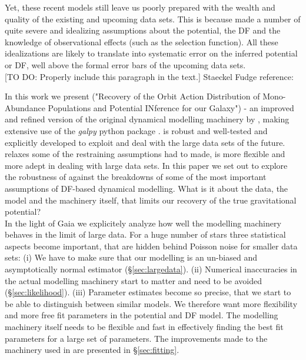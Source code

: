 Yet, these recent models still leave us poorly prepared with the wealth and quality of the existing and upcoming data sets. This is because \citet{bov13} made a number of quite severe and idealizing assumptions about the potential, the DF and the knowledge of observational effects (such as the selection function). All these idealizations are likely to translate into systematic error on the inferred potential or DF, well above the formal error bars of the upcoming data sets. \\

[TO DO: Properly include this paragraph in the text.] Staeckel Fudge reference: \citet{2012MNRAS.426.1324B} 

In this work we present \RM ("\textsc{R}ecovery of the \textsc{O}rbit \textsc{A}ction \textsc{D}istribution of \textsc{M}ono-\textsc{A}bundance \textsc{P}opulations and \textsc{P}otential \textsc{IN}ference for our \textsc{G}alaxy") - an improved and refined version of the original dynamical modelling machinery by \citet{bov13}, making extensive use of the \emph{galpy} python package \citep{bov15}. \RM is robust and well-tested and explicitly developed to exploit and deal with the large data sets of the future. \RM relaxes some of the restraining assumptions \citet{bov13} had to made, is more flexible and more adept in dealing with large data sets. In this paper we set out to explore the robustness of \RM against the breakdowns of some of the most important assumptions of DF-based dynamical modelling. What is it about the data, the model and the machinery itself, that limits our recovery of the true gravitational potential? \\

In the light of Gaia we explicitely analyze how well the modelling machinery behaves in the limit of large data. For a huge number of stars three statistical aspects become important, that are  hidden behind Poisson noise for smaller data sets: (i) We have to make sure that our modelling is an un-biased and asymptotically normal estimator (\S\ref{sec:largedata}). (ii) Numerical inaccuracies in the actual modelling machinery start to matter and need to be avoided (\S\ref{sec:likelihood}). (iii) Parameter estimates become so precise, that we start to be able to distinguish between similar models. We therefore want more flexibility and more free fit parameters in the potential and DF model. The modelling machinery itself needs to be flexible and fast in effectively finding the best fit parameters for a large set of parameters. The improvements made to the machinery used in \citet{bov13} are presented in \S\ref{sec:fitting}. \\

